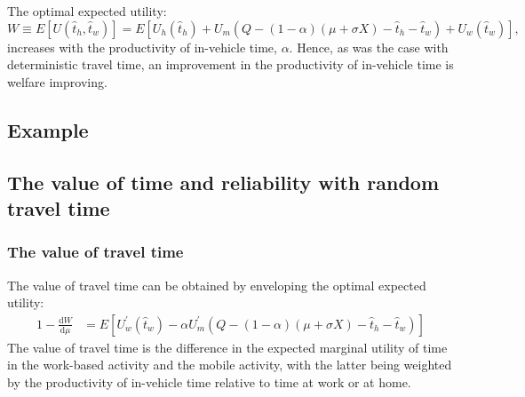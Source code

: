 \documentclass[12pt,a4paper,british]{article}
\theoremstyle{definition}
\theoremstyle{plain}
\theoremstyle{plain}
\theoremstyle{plain}
\begin{document}
The optimal expected utility: 
\begin{equation*}
W\equiv E\left[U\left(\hat{t}_{h},\hat{t}_{w}\right)\right]=E\left[U_{h}\left(\hat{t}_{h}\right)+U_{m}\left(Q-\left(1-\alpha\right)\left(\mu+\sigma X\right)-\hat{t}_{h}-\hat{t}_{w}\right)+U_{w}\left(\hat{t}_{w}\right)\right],
\end{equation*}
increases with the productivity of in-vehicle time, $\alpha$. Hence, as was the case with deterministic travel time, an improvement in
the productivity of in-vehicle time is welfare improving.

\subsection{Example}

\subsection{The value of time and reliability with random travel time}

\subsubsection*{The value of travel time}

The value of travel time can be obtained by enveloping the optimal expected utility:
\begin{alignat*}{1}
-\frac{\mathrm{d}W}{\mathrm{d}\mu} & =E\left[U_{w}^{\prime}\left(\hat{t}_{w}\right)-\alpha U_{m}^{\prime}\left(Q-\left(1-\alpha\right)\left(\mu+\sigma X\right)-\hat{t}_{h}-\hat{t}_{w}\right)\right]
\end{alignat*}
The value of travel time is the difference in the expected marginal utility of time in the work-based activity and the mobile activity,
with the latter being weighted by the productivity of in-vehicle time relative to time at work or at home. 
\end{document}

